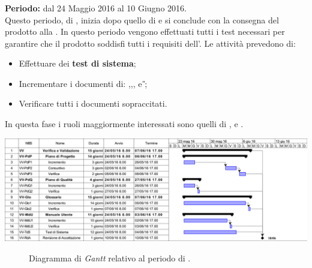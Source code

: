 \subsubsection{\VV}
\textbf{Periodo:} dal 24 Maggio 2016 al 10 Giugno 2016. \\
Questo periodo, di \VV, inizia dopo quello di \CO e si conclude con la consegna del prodotto alla \RA. In questo periodo vengono effettuati tutti i test necessari per garantire che il prodotto soddisfi tutti i requisiti dell'\AR.  
Le attività prevedono di:
\begin{itemize}
	\item Effettuare dei \textbf{test di sistema};  
	\item Incrementare i documenti di: \textit{\MU},\textit{\NdP},\textit{\PdP}, \textit{\PdQ} e \textit{\G};
	\item Verificare tutti i documenti sopraccitati.
\end{itemize}
In questa fase i ruoli maggiormente interessati sono quelli di \textit{\Res}, \textit{\Prog} e \textit{\Ver}. 
\newpage
\begin{center}
	\includegraphics[keepaspectratio = true, width=16cm]{immagini/PdP_VerificaEValidazioneGantt.png}
\end{center}
\begin{figure}[h]
	\caption{Diagramma di \textit{Gantt} relativo al periodo di \VV.}\label{etichetta}
\end{figure}